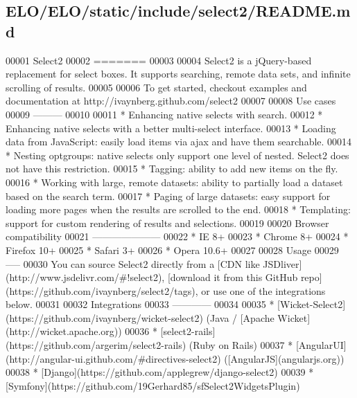 \hypertarget{ELO_2ELO_2static_2include_2select2_2README_8md_source}{\subsection{E\-L\-O/\-E\-L\-O/static/include/select2/\-R\-E\-A\-D\-M\-E.md}
}

\begin{DoxyCode}
00001 Select2
00002 =======
00003 
00004 Select2 is a jQuery-based replacement \textcolor{keywordflow}{for} select boxes. It supports searching, remote data sets, and 
      infinite scrolling of results.
00005 
00006 To \textcolor{keyword}{get} started, checkout examples and documentation at http:\textcolor{comment}{//ivaynberg.github.com/select2}
00007 
00008 Use cases
00009 ---------
00010 
00011 * Enhancing native selects with search.
00012 * Enhancing native selects with a better multi-select interface.
00013 * Loading data from JavaScript: easily load items via ajax and have them searchable.
00014 * Nesting optgroups: native selects only support one level of nested. Select2 does not have \textcolor{keyword}{this} 
      restriction.
00015 * Tagging: ability to add \textcolor{keyword}{new} items on the fly.
00016 * Working with large, remote datasets: ability to partially load a dataset based on the search term.
00017 * Paging of large datasets: easy support \textcolor{keywordflow}{for} loading more pages when the results are scrolled to the end.
00018 * Templating: support \textcolor{keywordflow}{for} custom rendering of results and selections.
00019 
00020 Browser compatibility
00021 ---------------------
00022 * IE 8+
00023 * Chrome 8+
00024 * Firefox 10+
00025 * Safari 3+
00026 * Opera 10.6+
00027  
00028 Usage
00029 -----
00030 You can source Select2 directly from a [CDN like JSDliver](http:\textcolor{comment}{//www.jsdelivr.com/#!select2), [download it
       from this GitHub repo](https://github.com/ivaynberg/select2/tags), or use one of the integrations below.}
00031 
00032 Integrations
00033 ------------
00034 
00035 * [Wicket-Select2](https:\textcolor{comment}{//github.com/ivaynberg/wicket-select2) (Java / [Apache
       Wicket](http://wicket.apache.org))}
00036 * [select2-rails](https:\textcolor{comment}{//github.com/argerim/select2-rails) (Ruby on Rails)}
00037 * [AngularUI](http:\textcolor{comment}{//angular-ui.github.com/#directives-select2) ([AngularJS](angularjs.org))}
00038 * [Django](https:\textcolor{comment}{//github.com/applegrew/django-select2)}
00039 * [Symfony](https:\textcolor{comment}{//github.com/19Gerhard85/sfSelect2WidgetsPlugin)}

\end{DoxyCode}
